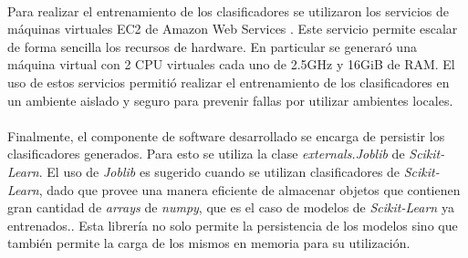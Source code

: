 \paragraph{} Para realizar el entrenamiento de los clasificadores se utilizaron los servicios de máquinas virtuales EC2 de Amazon Web Services \cite{aws}. Este servicio permite escalar de forma sencilla los recursos de hardware. En particular se generaró una máquina virtual con 2 CPU virtuales cada uno de 2.5GHz y 16GiB de RAM. El uso de estos servicios permitió realizar el entrenamiento de los clasificadores en un ambiente aislado y seguro para prevenir fallas por utilizar ambientes locales. 

\paragraph{} Finalmente, el componente de software desarrollado se encarga de persistir los clasificadores generados. Para esto se utiliza la clase \textit{externals.Joblib} de \textit{Scikit-Learn}. El uso de \textit{Joblib} es sugerido cuando se utilizan clasificadores de \textit{Scikit-Learn}, dado que provee una manera eficiente de almacenar objetos que contienen gran cantidad de \textit{arrays} de \textit{numpy}\cite{numpy}, que es el caso de modelos de \textit{Scikit-Learn} ya entrenados.\cite{persistence}. Esta librería no solo permite la persistencia de los modelos sino que también permite la carga de los mismos en memoria para su utilización.

